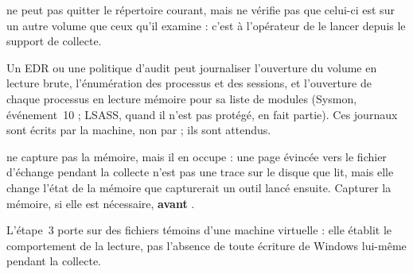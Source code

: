 \documentclass[11pt,a4paper,oneside]{report}
\begin{document}
\begin{description}[style=nextline,leftmargin=1.2em]
  \item[Dossier de sortie]  ne peut pas quitter le répertoire
        courant, mais \wac{} ne vérifie pas que celui-ci est sur un autre
        volume que ceux qu'il examine : c'est à l'opérateur de le lancer depuis
        le support de collecte.
  \item[Surveillance] Un EDR ou une politique d'audit peut journaliser
        l'ouverture du volume en lecture brute, l'énumération des processus et
        des sessions, et l'ouverture de chaque processus en lecture mémoire
        pour sa liste de modules (Sysmon, événement~10 ; LSASS, quand il n'est
        pas protégé, en fait partie). Ces journaux sont écrits par la machine, non par \wac{} ;
        ils sont attendus.
  \item[Mémoire] \wac{} ne capture pas la mémoire, mais il en occupe : une
        page évincée vers le fichier d'échange pendant la collecte n'est pas
        une trace sur le disque que \wac{} lit, mais elle change l'état de la
        mémoire que capturerait un outil lancé ensuite. Capturer la mémoire,
        si elle est nécessaire, \textbf{avant} \wac{}.
  \item[Mesure] L'étape~3 porte sur des fichiers témoins d'une machine
        virtuelle : elle établit le comportement de la lecture, pas l'absence
        de toute écriture de Windows lui-même pendant la collecte.
\end{description}
\end{document}
